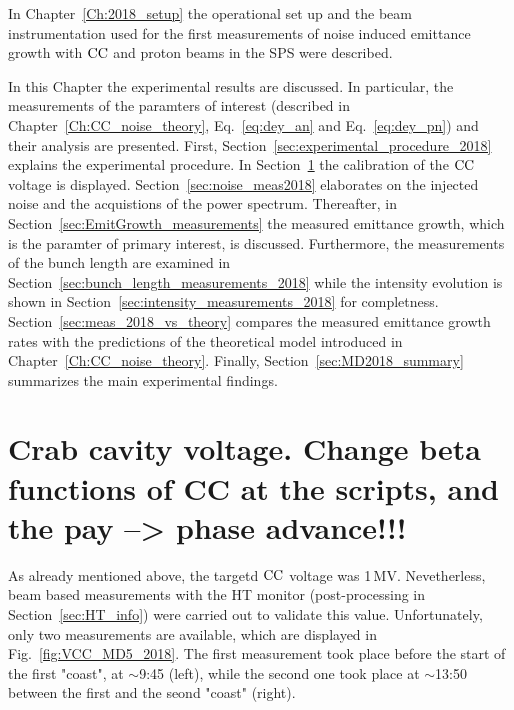 \vspace*{-1mm}
In Chapter~\ref{Ch:2018_setup} the operational set up and the beam instrumentation used for the first measurements of noise induced emittance growth with ${\mathrm{CC}}$ and proton beams in the SPS were described. 


In this Chapter the experimental results are discussed. In particular, the measurements of the paramters of interest (described in Chapter~\ref{Ch:CC_noise_theory}, Eq.~\eqref{eq:dey_an} and Eq.~\eqref{eq:dey_pn}) and their analysis are presented. First, Section~\ref{sec:experimental_procedure_2018} explains the experimental procedure.  In Section~\ref{sec:CC_voltage_meas2018} the calibration of the ${\mathrm{CC}}$ voltage is displayed. Section~\ref{sec:noise_meas2018} elaborates on the injected noise and the acquistions of the power spectrum. Thereafter, in Section~\ref{sec:EmitGrowth_measurements} the measured emittance growth, which is the paramter of primary interest, is discussed. Furthermore, the measurements of the bunch length are examined in Section~\ref{sec:bunch_length_measurements_2018} while the intensity evolution is shown in Section~\ref{sec:intensity_measurements_2018} for completness. Section~\ref{sec:meas_2018_vs_theory} compares the measured emittance growth rates with the predictions of the theoretical model introduced in Chapter~\ref{Ch:CC_noise_theory}. Finally, Section~\ref{sec:MD2018_summary} summarizes the main experimental findings.



\section{Crab cavity voltage. Change beta functions of CC at the scripts, and the pay --> phase advance!!!}\label{sec:CC_voltage_meas2018}

As already mentioned above, the targetd ${\mathrm{CC}}$ voltage was 1\,MV. Nevetherless, beam based measurements with the HT monitor (post-processing in Section~\ref{sec:HT_info}) were carried out to validate this value. Unfortunately, only two measurements are available, which are displayed in Fig.~\ref{fig:VCC_MD5_2018}. The first measurement took place before the start of the first "coast", at $\sim$9:45 (left), while the second one took place at $\sim$13:50 between the first and the seond "coast" (right). 


